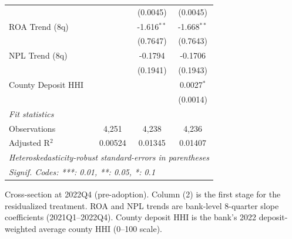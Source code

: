 \begin{tabular}{lccc}
                                     &                & (0.0045)        & (0.0045)\\   
   ROA Trend (8q)                    &                & -1.616$^{**}$   & -1.668$^{**}$\\   
                                     &                & (0.7647)        & (0.7643)\\   
   NPL Trend (8q)                    &                & -0.1794         & -0.1706\\   
                                     &                & (0.1941)        & (0.1943)\\   
   County Deposit HHI                &                &                 & 0.0027$^{*}$\\   
                                     &                &                 & (0.0014)\\   
   \midrule
   \emph{Fit statistics}\\
   Observations                      & 4,251          & 4,238           & 4,236\\  
   Adjusted R$^2$                    & 0.00524        & 0.01345         & 0.01407\\  
   \midrule \midrule
   \multicolumn{4}{l}{\emph{Heteroskedasticity-robust standard-errors in parentheses}}\\
   \multicolumn{4}{l}{\emph{Signif. Codes: ***: 0.01, **: 0.05, *: 0.1}}\\
\end{tabular}
 
\par \raggedright 
Cross-section at 2022Q4 (pre-adoption). Column (2) is the first stage for the residualized treatment. ROA and NPL trends are bank-level 8-quarter slope coefficients (2021Q1--2022Q4). County deposit HHI is the bank's 2022 deposit-weighted average county HHI (0--100 scale).
\par\endgroup


